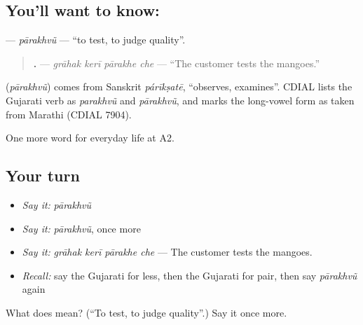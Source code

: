 \subsection*{You'll want to know: }
\textbf{} — \emph{pārakhvũ} — \textquotedblleft{}to test, to judge quality\textquotedblright{}.

\begin{quote}
\textbf{   .} — \emph{grāhak kerī pārakhe che} — \textquotedblleft{}The customer tests the mangoes.\textquotedblright{}
\end{quote}

\begin{cousinweb}
\textbf{} (\emph{pārakhvũ}) comes from Sanskrit \emph{párīkṣatē}, \textquotedblleft{}observes, examines\textquotedblright{}. CDIAL lists the Gujarati verb as \emph{parakhvũ} and \emph{pārakhvũ}, and marks the long-vowel form as taken from Marathi (CDIAL 7904).
\end{cousinweb}

\begin{grammarlens}[title={What you've built}]
One more word for everyday life at A2.
\end{grammarlens}

\subsection*{Your turn}
\begin{itemize}
\raggedright
  \item \emph{Say it:} \emph{pārakhvũ}
  \item \emph{Say it:} \emph{pārakhvũ}, once more
  \item \emph{Say it:} \emph{grāhak kerī pārakhe che} — The customer tests the mangoes.
  \item \emph{Recall:} say the Gujarati for less, then the Gujarati for pair, then say \emph{pārakhvũ} again
\end{itemize}

\begin{tcolorbox}[breakable,colback=teal!4,colframe=teal!35!black,title={Before you move on}]
What does  mean? (\textquotedblleft{}To test, to judge quality\textquotedblright{}.) Say it once more.
\end{tcolorbox}
